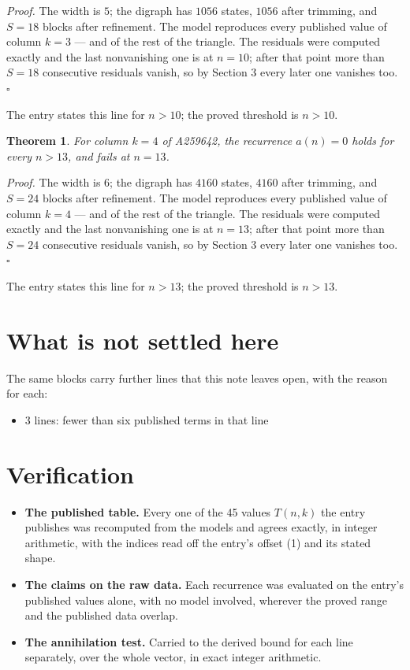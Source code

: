 \documentclass[11pt]{article}
\newtheorem{theorem}{Theorem}
\theoremstyle{definition}
\begin{document}
{\itshape Proof.} The width is $5$; the digraph has $1056$ states, $1056$ after trimming, and $S = 18$ blocks after refinement. The model reproduces every published value of column $k = 3$ --- and of the rest of the triangle. The residuals were computed exactly and the last nonvanishing one is at $n = 10$; after that point more than $S = 18$ consecutive residuals vanish, so by Section 3 every later one vanishes too. $\square$

The entry states this line for $n > 10$; the proved threshold is $n > 10$.

\begin{theorem} For column $k = 4$ of A259642, the recurrence $a(n) = 0$ holds for every $n > 13$, and fails at $n = 13$.\end{theorem}

{\itshape Proof.} The width is $6$; the digraph has $4160$ states, $4160$ after trimming, and $S = 24$ blocks after refinement. The model reproduces every published value of column $k = 4$ --- and of the rest of the triangle. The residuals were computed exactly and the last nonvanishing one is at $n = 13$; after that point more than $S = 24$ consecutive residuals vanish, so by Section 3 every later one vanishes too. $\square$

The entry states this line for $n > 13$; the proved threshold is $n > 13$.

\section{What is not settled here}

The same blocks carry further lines that this note leaves open, with the reason for each:

\begin{itemize}

\item 3 lines: fewer than six published terms in that line

\end{itemize}

\section{Verification}

\begin{itemize}

\item {\bfseries The published table.} Every one of the 45 values $T(n,k)$ the entry publishes was recomputed from the models and agrees exactly, in integer arithmetic, with the indices read off the entry's offset (1) and its stated shape.

\item {\bfseries The claims on the raw data.} Each recurrence was evaluated on the entry's published values alone, with no model involved, wherever the proved range and the published data overlap.

\item {\bfseries The annihilation test.} Carried to the derived bound for each line separately, over the whole vector, in exact integer arithmetic.

\end{itemize}
\end{document}
